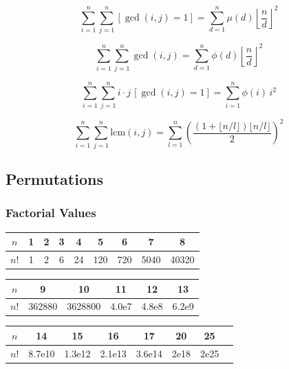 \[
\sum_{i=1}^n \sum_{j=1}^n [\gcd(i,j)=1]
= \sum_{d=1}^n \mu(d)\left\lfloor \frac{n}{d} \right\rfloor^2
\]

\[
\sum_{i=1}^n \sum_{j=1}^n \gcd(i,j)
= \sum_{d=1}^n \phi(d)\left\lfloor \frac{n}{d} \right\rfloor^2
\]

\[
\sum_{i=1}^n \sum_{j=1}^n i\cdot j\,[\gcd(i,j)=1]
= \sum_{i=1}^n \phi(i)\,i^2
\]

\[
\sum_{i=1}^{n}\sum_{j=1}^{n}\mathrm{lcm}(i,j)
= \sum_{l=1}^n
\left(
\frac{(1+\lfloor n/l\rfloor)\lfloor n/l\rfloor}{2}
\right)^2
\]

\subsection{Permutations}
\subsubsection{Factorial Values}

\begin{center}
\begin{tabular}{c|cccccccc}
$n$  & 1 & 2 & 3 & 4 & 5 & 6 & 7 &8\\
\hline
$n!$ & 1 & 2 & 6 & 24 & 120 & 720 & 5040 &40320\\
\end{tabular}

\vspace{3mm}

\begin{tabular}{c|ccccc}
$n$  & 9 & 10 & 11 & 12 & 13\\
\hline
$n!$ & 362880 & 3628800 & 4.0e7 & 4.8e8 & 6.2e9\\
\end{tabular}

\vspace{3mm}

\begin{tabular}{c|ccccccc}
$n$  & 14 & 15 & 16 & 17 & 20 &25\\
\hline
$n!$ & 8.7e10 & 1.3e12 & 2.1e13 & 3.6e14 & 2e18 &2e25\\
\end{tabular}

\end{center}





